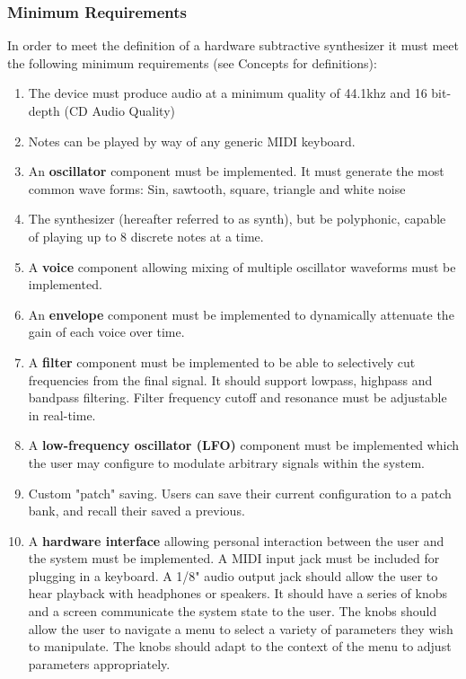 \documentclass[acmlarge,screen]{acmart}
\begin{document}
	\subsubsection{Minimum Requirements}
	In order to meet the definition of a hardware subtractive synthesizer it must meet the following minimum requirements (see Concepts for definitions):
	\begin{enumerate}
		\item The device must produce audio at a minimum quality of 44.1khz and 16 bit-depth (CD Audio Quality)
		\item Notes can be played by way of any generic MIDI keyboard.
		\item An \textbf{oscillator} component must be implemented. It must generate the most common wave forms: Sin, sawtooth, square, triangle and white noise
		\item The synthesizer (hereafter referred to as synth), but be polyphonic, capable of playing up to 8 discrete notes at a time.
		\item A \textbf{voice} component allowing mixing of multiple oscillator waveforms must be implemented.
		\item An \textbf{envelope} component must be implemented to dynamically attenuate the gain of each voice over time.
		\item A \textbf{filter} component must be implemented to be able to selectively cut frequencies from the final signal. It should support lowpass, highpass and bandpass filtering. Filter frequency cutoff and resonance must be adjustable in real-time.
		\item A \textbf{low-frequency oscillator (LFO)} component must be implemented which the user may configure to modulate arbitrary signals within the system.
		\item Custom "patch" saving. Users can save their current configuration to a patch bank, and recall their saved a previous.
		\item A \textbf{hardware interface} allowing personal interaction between the user and the system must be implemented. A MIDI input jack must be included for plugging in a keyboard. A 1/8" audio output jack should allow the user to hear playback with headphones or speakers. It should have a series of knobs and a screen communicate the system state to the user. The knobs should allow the user to navigate a menu to select a variety of parameters they wish to manipulate. The knobs should adapt to the context of the menu to adjust parameters appropriately.
	\end{enumerate} \cite{rise_2016}
\end{document}
